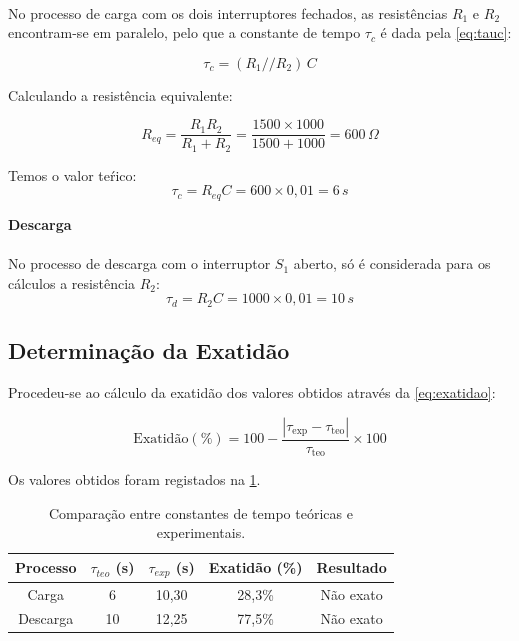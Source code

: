 \paragraph{}
No processo de carga com os dois interruptores fechados, as resistências $R_1$ e $R_2$ encontram-se em paralelo, pelo que a constante de tempo $\tau_c$ é dada pela \cref{eq:tauc}:

\begin{equation} \label{eq:tauc}
	\tau_c = (R_1 // R_2)\,C
\end{equation}

Calculando a resistência equivalente:

\begin{equation*}
	R_{eq} = \frac{R_1 R_2}{R_1 + R_2}
	= \frac{1500 \times 1000}{1500 + 1000}
	= 600\,\Omega
\end{equation*}

Temos o valor teŕico:
\begin{equation}
	\tau_c = R_{eq}C = 600 \times 0,01 = 6\,s
\end{equation}


\textbf{Descarga}
\paragraph{}No processo de descarga com o interruptor $S_1$ aberto, só é considerada para os cálculos a resistência $R_2$:
\begin{equation*}
	\tau_d = R_2 C = 1000 \times 0,01 = 10\,s
\end{equation*}
\subsection{Determinação da Exatidão}
Procedeu-se ao cálculo da exatidão dos valores obtidos através da \cref{eq:exatidao}:

\begin{equation} \label{eq:exatidao}
	\text{Exatidão}(\%) = 100 - \frac{|\tau_{\text{exp}} - \tau_{\text{teo}}|}{\tau_{\text{teo}}} \times 100
\end{equation}


Os valores obtidos foram registados na \cref{tab:exatid}.
\begin{table}[h]
	\centering
	\caption{Comparação entre constantes de tempo teóricas e experimentais.}
	\label{tab:exatid}
	\begin{tabular}{c c c c c}
		\hline
		Processo & $\tau_{teo}$ (s) & $\tau_{exp}$ (s) & Exatidão (\%) & Resultado            \\
		\hline
		Carga    & 6                & 10,30            & 28,3\%        & Não exato \\
		Descarga & 10               & 12,25            & 77,5\%        & Não exato \\
		\hline
	\end{tabular}
\end{table}
